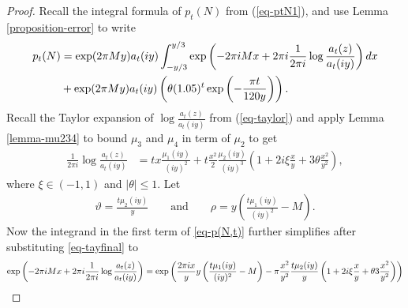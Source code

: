\documentclass[10pt,a4paper]{amsart}
\numberwithin{equation}{section}
\begin{document}
	\begin{proof}
		Recall the integral formula of $p_t(N)$ from (\ref{eq-ptN1}),
		and use Lemma \ref{proposition-error} to write
		\begin{align}\label{eq-p(N,t)}
			p_t(N)&=\exp(2\pi My)a_{t}(iy)\int_{-y/3}^{y/3}\exp\left(-2\pi i Mx+2\pi i\frac{1}{2\pi i}\log\frac{a_{t}(z)}{a_{t}(iy)}\right)dx\\
			\notag
			&+\exp(2\pi My)a_{t}(iy)\left(\theta(1.05)^{t}\exp\left(-\frac{\pi t}{120y}\right)\right).
		\end{align}
		Recall the Taylor expansion of $\log \frac{a_t(z)}{a_t(iy)}$ from (\ref{eq-taylor}) and apply Lemma \ref{lemma-mu234} to bound $\mu_3$ and $\mu_4$ in term of $\mu_2$ to get  
		\begin{align}\label{eq-tayfinal}
			\frac{1}{2\pi i}\log \frac{a_{t}(z)}{a_{t}(iy)}&=tx\frac{\mu_{1}(iy)}{(iy)^{2}}+t\frac{x^{2}}{2}\frac{\mu_{2}(iy)}{(iy)^{3}}\left(1+2i\xi\frac{x}{y}+3\theta\frac{x^{2}}{y^{2}}\right),   
		\end{align}
		where $\xi \in(-1,1)$ and $|\theta|\le 1.$
		\newline
		Let
		\begin{align}\label{eq-alphaerr}
			\vartheta=\frac{t\mu_{2}(iy)}{y} \qquad\text{and} \qquad\rho=y\left(\frac{t\mu_{1}(iy)}{(iy)^{2}}-M\right). 
		\end{align}
		Now the integrand in the first term of \eqref{eq-p(N,t)} further simplifies after substituting \eqref{eq-tayfinal} to
		\begin{align}\label{eq-exppart}
			\notag
			\exp\left(-2\pi i Mx+2\pi i\frac{1}{2\pi i}\log\frac{a_{t}(z)}{a_{t}(iy)}\right)&=\exp\left(\frac{2\pi ix}{y}y\left(\frac{t\mu_1(iy)}{(iy)^{2}}-M\right)-\pi \frac{x^{2}}{y^{2}}\frac{t\mu_{2}(iy)}{y}\left(1+2i\xi \frac{x}{y}+\theta 3\frac{x^{2}}{y^{2}}\right)\right)\\

\end{align}
\end{proof}
\end{document}
